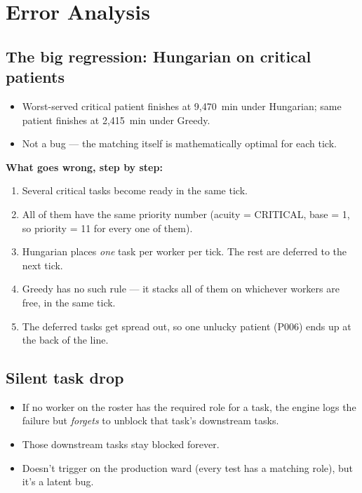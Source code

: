 \section{Error Analysis}
\label{sec:error}

\subsection{The big regression: Hungarian on critical patients}

\begin{itemize}
  \item Worst-served critical patient finishes at 9{,}470~min under
        Hungarian; same patient finishes at 2{,}415~min under
        Greedy.
  \item Not a bug --- the matching itself is mathematically optimal
        for each tick.
\end{itemize}

\textbf{What goes wrong, step by step:}

\begin{enumerate}
  \item Several critical tasks become ready in the same tick.
  \item All of them have the same priority number (acuity = CRITICAL,
        base = 1, so priority = 11 for every one of them).
  \item Hungarian places \emph{one} task per worker per tick. The
        rest are deferred to the next tick.
  \item Greedy has no such rule --- it stacks all of them on
        whichever workers are free, in the same tick.
  \item The deferred tasks get spread out, so one unlucky patient
        (P006) ends up at the back of the line.
\end{enumerate}

\subsection{Silent task drop}

\begin{itemize}
  \item If no worker on the roster has the required role for a
        task, the engine logs the failure but \emph{forgets} to
        unblock that task's downstream tasks.
  \item Those downstream tasks stay blocked forever.
  \item Doesn't trigger on the production ward (every test has a
        matching role), but it's a latent bug.
\end{itemize}

